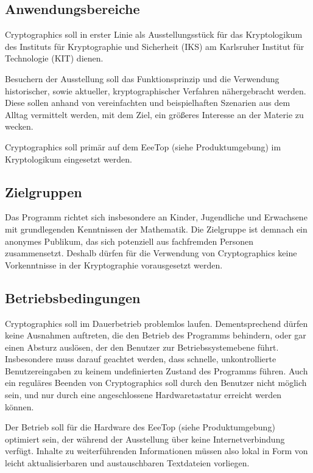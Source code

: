 \documentclass{article}
\begin{document}
\subsection{Anwendungsbereiche}
\gls{Cryptographics} soll in erster Linie als Ausstellungsstück für das \gls{Kryptologikum} des Instituts für Kryptographie und Sicherheit (\gls{IKS}) am Karlsruher Institut für Technologie (\gls{KIT}) dienen.

Besuchern der Ausstellung soll das Funktionsprinzip und die Verwendung historischer, sowie aktueller, kryptographischer Verfahren nähergebracht werden. Diese sollen anhand von vereinfachten und beispielhaften Szenarien aus dem Alltag vermittelt werden, mit dem Ziel, ein größeres Interesse an der Materie zu wecken.

\gls{Cryptographics} soll primär auf dem \gls{EeeTop} (siehe Produktumgebung) im \gls{Kryptologikum} eingesetzt werden.

\subsection{Zielgruppen}

Das Programm richtet sich insbesondere an Kinder, Jugendliche und Erwachsene mit grundlegenden Kenntnissen der Mathematik. Die Zielgruppe ist demnach ein anonymes Publikum, das sich potenziell aus fachfremden Personen zusammensetzt. Deshalb dürfen für die Verwendung von \gls{Cryptographics} keine Vorkenntnisse in der Kryptographie vorausgesetzt werden.

\subsection{Betriebsbedingungen}

\gls{Cryptographics} soll im Dauerbetrieb problemlos laufen. Dementsprechend dürfen keine Ausnahmen auftreten, die den Betrieb des Programms behindern, oder gar einen Absturz auslösen, der den Benutzer zur Betriebssystemebene führt. Insbesondere muss darauf geachtet werden, dass schnelle, unkontrollierte Benutzereingaben zu keinem undefinierten Zustand des Programms führen. Auch ein reguläres Beenden von \gls{Cryptographics} soll durch den Benutzer nicht möglich sein, und nur durch eine angeschlossene Hardwaretastatur erreicht werden können.

Der Betrieb soll für die Hardware des \gls{EeeTop} (siehe Produktumgebung) optimiert sein, der während der Ausstellung über keine Internetverbindung verfügt. Inhalte zu weiterführenden Informationen müssen also lokal in Form von leicht aktualisierbaren und austauschbaren Textdateien vorliegen.
\end{document}
